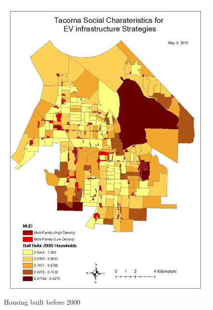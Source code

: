 \documentclass[]{article}
\begin{document}
\begin{figure}
\centering
\includegraphics{./figs/built.jpg}
\caption{Housing built before 2000}
\end{figure}
\end{document}
